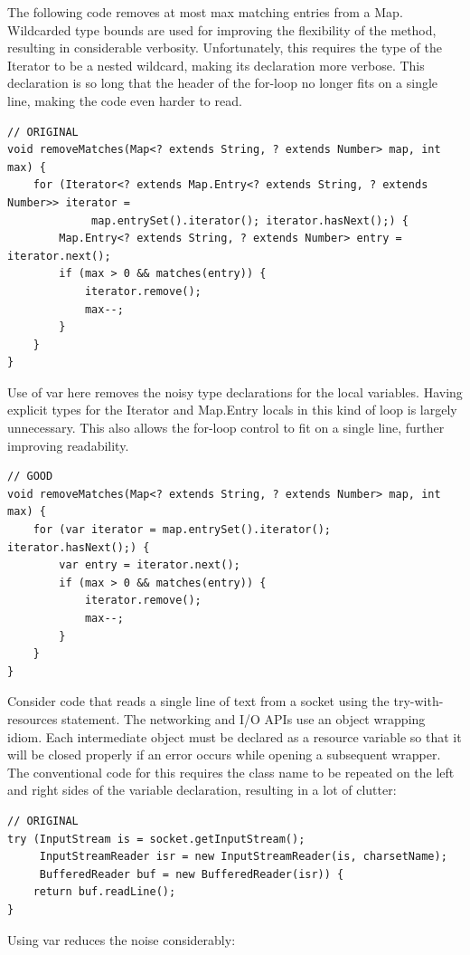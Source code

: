 \documentclass[11pt,a4paper, titlepage, parskip=half, headsepline, footsepline, cleardoublepage=current, headheight=1cm]{scrbook}
\begin{document}
The following code removes at most max matching entries from a Map. Wildcarded type bounds are used for improving the flexibility of the method, resulting in considerable verbosity. Unfortunately, this requires the type of the Iterator to be a nested wildcard, making its declaration more verbose. This declaration is so long that the header of the for-loop no longer fits on a single line, making the code even harder to read.

\begin{lstlisting}
// ORIGINAL
void removeMatches(Map<? extends String, ? extends Number> map, int max) {
    for (Iterator<? extends Map.Entry<? extends String, ? extends Number>> iterator =
             map.entrySet().iterator(); iterator.hasNext();) {
        Map.Entry<? extends String, ? extends Number> entry = iterator.next();
        if (max > 0 && matches(entry)) {
            iterator.remove();
            max--;
        }
    }
}
\end{lstlisting}
Use of var here removes the noisy type declarations for the local variables. Having explicit types for the Iterator and Map.Entry locals in this kind of loop is largely unnecessary. This also allows the for-loop control to fit on a single line, further improving readability.

\begin{lstlisting}
// GOOD
void removeMatches(Map<? extends String, ? extends Number> map, int max) {
    for (var iterator = map.entrySet().iterator(); iterator.hasNext();) {
        var entry = iterator.next();
        if (max > 0 && matches(entry)) {
            iterator.remove();
            max--;
        }
    }
}
\end{lstlisting}

Consider code that reads a single line of text from a socket using the try-with-resources statement. The networking and I/O APIs use an object wrapping idiom. Each intermediate object must be declared as a resource variable so that it will be closed properly if an error occurs while opening a subsequent wrapper. The conventional code for this requires the class name to be repeated on the left and right sides of the variable declaration, resulting in a lot of clutter:

\begin{lstlisting}
// ORIGINAL
try (InputStream is = socket.getInputStream();
     InputStreamReader isr = new InputStreamReader(is, charsetName);
     BufferedReader buf = new BufferedReader(isr)) {
    return buf.readLine();
}
\end{lstlisting}
Using var reduces the noise considerably:
\end{document}
